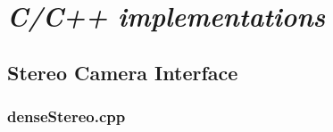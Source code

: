 \chapter{\emph{C/C++ implementations}}

\section{Stereo Camera Interface}
\label{app:stereo-camera}


\lstset{%
    language=C++,
    basicstyle=\tiny, %
    stringstyle=\ttfamily, %
    showstringspaces=false} %


\subsection{denseStereo.cpp}

